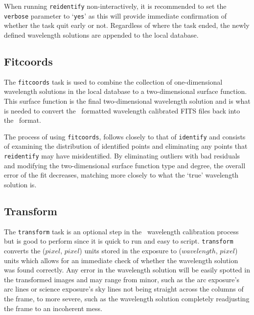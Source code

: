 When running \texttt{reidentify} non-interactively, it is recommended to set the \texttt{verbose} parameter to `\texttt{yes}' as this will provide immediate confirmation of whether the task quit early or not. Regardless of where the task ended, the newly defined wavelength solutions are appended to the local database.

\subsection{Fitcoords}

The \texttt{fitcoords} task is used to combine the collection of one-dimensional wavelength solutions in the local database to a two-dimensional surface function. This surface function is the final two-dimensional wavelength solution and is what is needed to convert the \iraf\ formatted wavelength calibrated \gls{FITS} files back into the \polsalt\ format.

The process of using \texttt{fitcoords}, follows closely to that of \texttt{identify} and consists of examining the distribution of identified points and eliminating any points that \texttt{reidentify} may have misidentified. By eliminating outliers with bad residuals and modifying the two-dimensional surface function type and degree, the overall error of the fit decreases, matching more closely to what the `true' wavelength solution is.

\subsection{Transform}

The \texttt{transform} task is an optional step in the \iraf\ wavelength calibration process but is good to perform since it is quick to run and easy to script. \texttt{transform} converts the ($pixel$, $pixel$) units stored in the exposure to ($wavelength$, $pixel$) units which allows for an immediate check of whether the wavelength solution was found correctly. Any error in the wavelength solution will be easily spotted in the transformed images and may range from minor, such as the arc exposure's arc lines or science exposure's sky lines not being straight across the columns of the frame, to more severe, such as the wavelength solution completely readjusting the frame to an incoherent mess.

